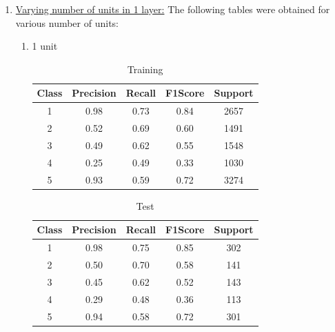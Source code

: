 \begin{enumerate}[label=(\alph*)]
    \item \underline{Varying number of units in 1 layer:} The following tables were obtained for various number of units:
          \begin{enumerate}[label=\roman*.]
              \item 1 unit
                    \begin{table}[!htb]
                        \centering
                        \begin{tabular}{ccccc}
                            \hline
                            Class & Precision & Recall & F1Score & Support \\ \hline
                            1     & 0.98      & 0.73   & 0.84    & 2657    \\
                            2     & 0.52      & 0.69   & 0.60    & 1491    \\
                            3     & 0.49      & 0.62   & 0.55    & 1548    \\
                            4     & 0.25      & 0.49   & 0.33    & 1030    \\
                            5     & 0.93      & 0.59   & 0.72    & 3274    \\ \hline
                        \end{tabular}
                        \caption{Training}
                        \label{part b train 1 unit}
                    \end{table}
                    \begin{table}[!htb]
                        \centering
                        \begin{tabular}{ccccc}
                            \hline
                            Class & Precision & Recall & F1Score & Support \\ \hline
                            1     & 0.98      & 0.75   & 0.85    & 302     \\
                            2     & 0.50      & 0.70   & 0.58    & 141     \\
                            3     & 0.45      & 0.62   & 0.52    & 143     \\
                            4     & 0.29      & 0.48   & 0.36    & 113     \\
                            5     & 0.94      & 0.58   & 0.72    & 301     \\ \hline
                        \end{tabular}
                        \caption{Test}
                        \label{part b test 1 unit}

\end{table}
\end{enumerate}
\end{enumerate}
